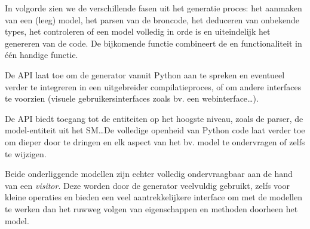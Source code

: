 In volgorde zien we de verschillende fasen uit het generatie proces: het
aanmaken van een (leeg) model, het parsen van de broncode, het deduceren van
onbekende types, het controleren of een model volledig in orde is en
uiteindelijk het genereren van de code. De bijkomende  functie
combineert de  en  functionaliteit in \'e\'en
handige functie.

De API laat toe om de generator vanuit Python aan te spreken en eventueel
verder te integreren in een uitgebreider compilatieproces, of om andere
interfaces te voorzien (visuele gebruikersinterfaces zoals bv. een
webinterface\dots).

De API biedt toegang tot de entiteiten op het hoogste niveau, zoals de parser,
de model-entiteit uit het SM\dots De volledige openheid van Python code laat
verder toe om dieper door te dringen en elk aspect van het bv. model te
ondervragen of zelfs te wijzigen.

Beide onderliggende modellen zijn echter volledig ondervraagbaar aan de hand
van een \emph{visitor}. Deze worden door de generator veelvuldig gebruikt,
zelfs voor kleine operaties en bieden een veel aantrekkelijkere interface om
met de modellen te werken dan het ruwweg volgen van eigenschappen en methoden
doorheen het model.

